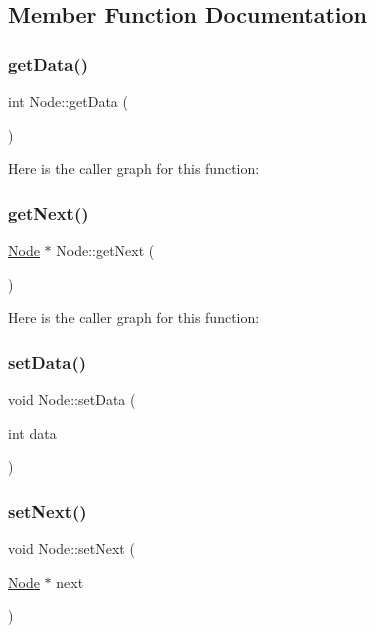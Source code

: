 \subsection{Member Function Documentation}
\mbox{\label{class_node_aca98907146d5d0687f48bf8be9df9b7d}} 
\subsubsection{\texorpdfstring{get\+Data()}{getData()}}
{\footnotesize\ttfamily int Node\+::get\+Data (\begin{DoxyParamCaption}{ }\end{DoxyParamCaption})}

Here is the caller graph for this function\+:
\mbox{\label{class_node_ae36639ff267d63e058ce309fde5a9913}} 
\subsubsection{\texorpdfstring{get\+Next()}{getNext()}}
{\footnotesize\ttfamily \hyperlink{class_node}{Node} $\ast$ Node\+::get\+Next (\begin{DoxyParamCaption}{ }\end{DoxyParamCaption})}

Here is the caller graph for this function\+:
\mbox{\label{class_node_a0a2c821ab31b604e4fdd7cf39be5cc68}} 
\subsubsection{\texorpdfstring{set\+Data()}{setData()}}
{\footnotesize\ttfamily void Node\+::set\+Data (\begin{DoxyParamCaption}\item[{int}]{data }\end{DoxyParamCaption})}

\mbox{\label{class_node_a89b12aca90acdf6a8a547cbdab9b80a5}} 
\subsubsection{\texorpdfstring{set\+Next()}{setNext()}}
{\footnotesize\ttfamily void Node\+::set\+Next (\begin{DoxyParamCaption}\item[{\hyperlink{class_node}{Node} $\ast$}]{next }\end{DoxyParamCaption})}

